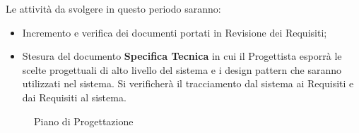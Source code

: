 {{	Le attività da svolgere in questo periodo saranno:
	\begin{itemize}
		\item Incremento e verifica dei documenti portati in Revisione dei Requisiti;
		\item Stesura del documento \textbf{Specifica Tecnica} in cui il Progettista esporrà le scelte progettuali di alto livello del sistema e i design pattern che saranno utilizzati nel sistema. Si verificherà il tracciamento dal sistema ai Requisiti e dai Requisiti al sistema.
	\end{itemize}
	
	\begin{landscape}
		\thispagestyle{empty}
		\begin{figure}[H]
			\parbox[c][\textwidth][s]{\linewidth}{
			\centering
			\vspace*{\fill}
			\vspace*{\fill}
			\label{fig:pianoprogettazione}
			\caption{Piano di Progettazione}}
		\end{figure}
	\end{landscape}

}}
